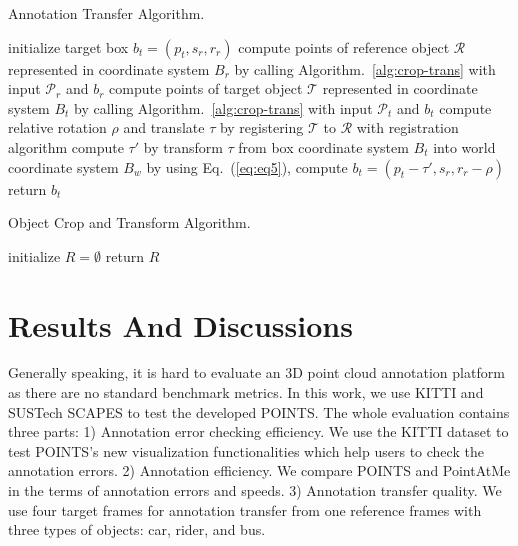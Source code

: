 \documentclass[letterpaper, 10 pt, conference]{ieeeconf}  %
\begin{document}
\begin{algorithm}
	\caption{Annotation Transfer Algorithm.}
	\label{alg:anno-trans}
	
	\SetAlgoLined
	
	\nl initialize target box $b_t = (p_t,s_r,r_r)$\;
	\nl compute points of reference object $\mathcal{R}$ represented in coordinate system $B_r$ by calling Algorithm.~\ref{alg:crop-trans} with input $\mathcal{P}_r$ and $b_r$\;
	\nl compute points of target object $\mathcal{T}$ represented in coordinate system $B_t$ by calling Algorithm.~\ref{alg:crop-trans} with input $\mathcal{P}_t$ and $b_t$\;
	\nl compute relative rotation $\rho$ and translate $\tau$ by registering $\mathcal{T}$ to $\mathcal{R}$ with registration algorithm \cite{Yang2016GoICPAG} \;
	\nl compute $\tau'$ by transform $\tau$ from box coordinate system $B_t$ into world coordinate system $B_w$\;
	\nl	by using Eq.~(\ref{eq:eq5}), compute $b_t = (p_t-\tau', s_r, r_r-\rho)$\;
	\nl return $b_t$\;
	
\end{algorithm}
\begin{algorithm}
	\caption{Object Crop and Transform Algorithm.}
	\label{alg:crop-trans}
	
	\SetAlgoLined
	\nl initialize $R = \emptyset $ \;
	\nl {}
	\nl return $R$\;
	
\end{algorithm}

\section{Results And Discussions}
\label {sec:results}

Generally speaking, it is hard to evaluate an 3D point cloud annotation platform as there are no standard benchmark metrics.
In this work, we use KITTI \cite{Geiger2012CVPR} and SUSTech SCAPES to test the developed POINTS.
The whole evaluation contains three parts:
1) Annotation error checking efficiency. We use the KITTI dataset\cite{Geiger2012CVPR} to test POINTS's new visualization functionalities which help users to check the annotation errors.
2) Annotation efficiency. We compare POINTS and PointAtMe \cite{pointatme} in the terms of annotation errors and speeds.
3) Annotation transfer quality. We use four target frames for annotation transfer from one reference frames with three types of objects: car, rider, and bus.
\end{document}
